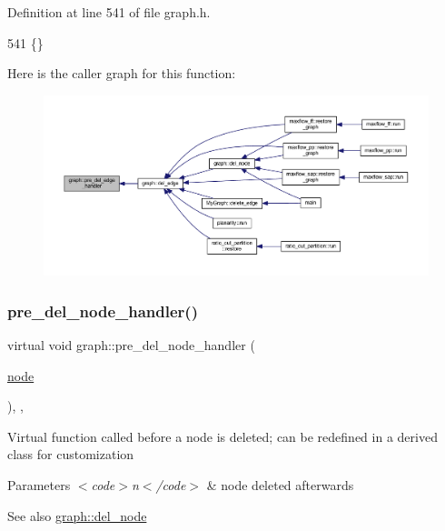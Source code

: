 Definition at line 541 of file graph.\+h.


\begin{DoxyCode}
541 \{\}           
\end{DoxyCode}
Here is the caller graph for this function\+:
\nopagebreak
\begin{figure}[H]
\begin{center}
\leavevmode
\includegraphics[width=350pt]{classgraph_a2cd0986dc5bcbfdbf0635c39e610784b_icgraph}
\end{center}
\end{figure}
\mbox{\label{classgraph_a64699c6cb14cdedab5e13232a8f3e754}} 
\subsubsection{\texorpdfstring{pre\+\_\+del\+\_\+node\+\_\+handler()}{pre\_del\_node\_handler()}}
{\footnotesize\ttfamily virtual void graph\+::pre\+\_\+del\+\_\+node\+\_\+handler (\begin{DoxyParamCaption}\item[{\mbox{\hyperlink{classnode}{node}}}]{ }\end{DoxyParamCaption})\hspace{0.3cm}{\ttfamily [inline]}, {\ttfamily [virtual]}, {\ttfamily [inherited]}}

Virtual function called before a node is deleted; can be redefined in a derived class for customization


\begin{DoxyParams}{Parameters}
{\em $<$code$>$n$<$/code$>$} & node deleted afterwards \\
\hline
\end{DoxyParams}
\begin{DoxySeeAlso}{See also}
\mbox{\hyperlink{classgraph_a8bdc09d5b9ac4bd26586b054d8fcbe91}{graph\+::del\+\_\+node}} 
\end{DoxySeeAlso}


